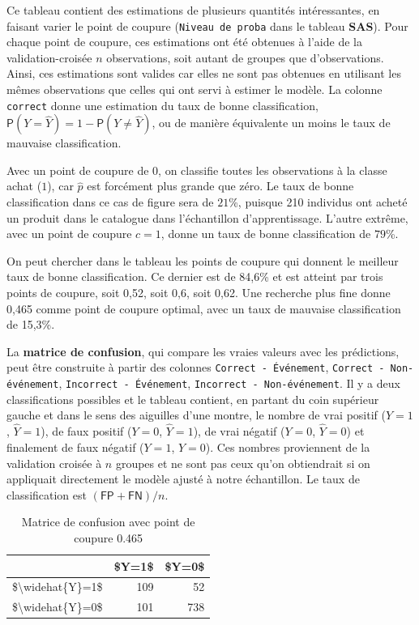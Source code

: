 \documentclass[
  11pt,
  letterpaper,
]{book}
\theoremstyle{definition}
\theoremstyle{definition}
\theoremstyle{definition}
\theoremstyle{remark}
\begin{document}
Ce tableau contient des estimations de plusieurs quantités intéressantes, en faisant varier le point de coupure (\texttt{Niveau\ de\ proba} dans le tableau \textbf{SAS}). Pour chaque point de coupure, ces estimations ont été obtenues à l'aide de la validation-croisée \(n\) observations, soit autant de groupes que d'observations. Ainsi, ces estimations sont valides car elles ne sont pas obtenues en utilisant les mêmes observations que celles qui ont servi à estimer le modèle.
La colonne \texttt{correct} donne une estimation du taux de bonne classification, \({\mathsf P}\left(Y = \widehat{Y}\right) = 1-{\mathsf P}\left(Y \neq \widehat{Y}\right)\), ou de manière équivalente un moins le taux de mauvaise classification.

Avec un point de coupure de \(0\), on classifie toutes les observations à la classe achat (\(1\)), car \(\widehat{p}\) est forcément plus grande que zéro. Le taux de bonne classification dans ce cas de figure sera de \(21\)\%, puisque 210 individus ont acheté un produit dans le catalogue dans l'échantillon d'apprentissage.
L'autre extrême, avec un point de coupure \(c=1\), donne un taux de bonne classification de \(79\)\%.

On peut chercher dans le tableau les points de coupure qui donnent le meilleur taux de bonne classification. Ce dernier est de 84,6\% et est atteint par trois points de coupure, soit 0,52, soit 0,6, soit 0,62. Une recherche plus fine donne 0,465 comme point de coupure optimal, avec un taux de mauvaise classification de 15,3\%.

La \textbf{matrice de confusion}, qui compare les vraies valeurs avec les prédictions, peut être construite à partir des colonnes \texttt{Correct\ -\ Événement}, \texttt{Correct\ -\ Non-événement}, \texttt{Incorrect\ -\ Événement}, \texttt{Incorrect\ -\ Non-événement}. Il y a deux classifications possibles et le tableau contient, en partant du coin supérieur gauche et dans le sens des aiguilles d'une montre, le nombre de vrai positif (\(Y=1\), \(\widehat{Y}=1\)), de faux positif (\(Y=0\), \(\widehat{Y}=1\)), de vrai négatif (\(Y=0\), \(\widehat{Y}=0\)) et finalement de faux négatif (\(Y=1\), \(\widehat{Y}=0\)). Ces nombres proviennent de la validation croisée à \(n\) groupes et ne sont pas ceux qu'on obtiendrait si on appliquait directement le modèle ajusté à notre échantillon. Le taux de classification est \((\mathsf{FP}+\mathsf{FN})/n\).

\begin{table}

\caption{\label{tab:confumat}Matrice de confusion avec point de coupure 0.465}
\centering
\begin{tabular}[t]{l|r|r}
\hline
  & \$Y=1\$ & \$Y=0\$\\
\hline
\$\textbackslash{}widehat\{Y\}=1\$ & 109 & 52\\
\hline
\$\textbackslash{}widehat\{Y\}=0\$ & 101 & 738\\
\hline
\end{tabular}
\end{table}
\end{document}
